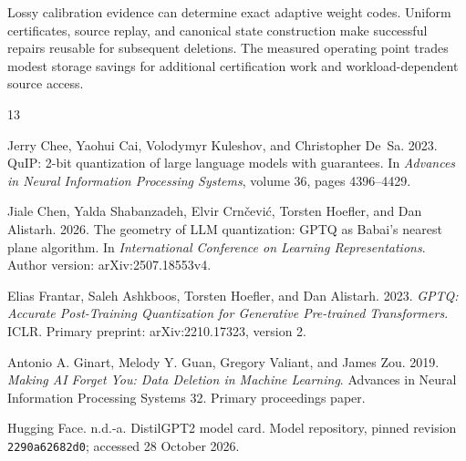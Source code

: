 \documentclass[11pt,a4paper]{article}
\makeatletter
\def\href#1#2{{#2}}
\def\section{\@startsection {section}{1}{\z@}{-2.0ex plus
    -0.5ex minus -.2ex}{1.5ex plus 0.3ex minus .2ex}{\large\bf\raggedright}}
\makeatother
\begin{document}
\section{Conclusion}
Lossy calibration evidence can determine exact adaptive weight codes. Uniform
certificates, source replay, and canonical state construction make successful
repairs reusable for subsequent deletions. The measured operating point trades
modest storage savings for additional certification work and workload-dependent
source access.
\label{page:main-end}
\clearpage
\begin{thebibliography}{13}

Jerry Chee, Yaohui Cai, Volodymyr Kuleshov, and Christopher De~Sa. 2023.
\href{https://proceedings.neurips.cc/paper_files/paper/2023/hash/0df38cd13520747e1e64e5b123a78ef8-Abstract-Conference.html}{QuIP: 2-bit quantization of large language models with guarantees}.
In \emph{Advances in Neural Information Processing Systems}, volume 36, pages 4396--4429.

Jiale Chen, Yalda Shabanzadeh, Elvir Crn\v{c}evi\'{c}, Torsten Hoefler, and Dan Alistarh. 2026.
\href{https://arxiv.org/abs/2507.18553v4}{The geometry of LLM quantization: GPTQ as Babai's nearest plane algorithm}.
In \emph{International Conference on Learning Representations}. Author version: arXiv:2507.18553v4.

Elias Frantar, Saleh Ashkboos, Torsten Hoefler, and Dan Alistarh.
2023. \emph{GPTQ: Accurate Post-Training Quantization for Generative Pre-trained
Transformers}. ICLR. Primary preprint:
\href{https://arxiv.org/abs/2210.17323v2}{arXiv:2210.17323, version 2}.

Antonio A. Ginart, Melody Y. Guan, Gregory Valiant, and James Zou.
2019. \emph{Making AI Forget You: Data Deletion in Machine Learning}.
Advances in Neural Information Processing Systems 32.
\href{https://papers.nips.cc/paper_files/paper/2019/file/cb79f8fa58b91d3af6c9c991f63962d3-Paper.pdf}{Primary proceedings paper}.

Hugging Face. n.d.-a.
\href{https://huggingface.co/distilbert/distilgpt2/blob/2290a62682d06624634c1f46a6ad5be0f47f38aa/README.md}{DistilGPT2 model card}.
Model repository, pinned revision \nolinkurl{2290a62682d0}; accessed 28 October 2026.


\end{thebibliography}
\end{document}
